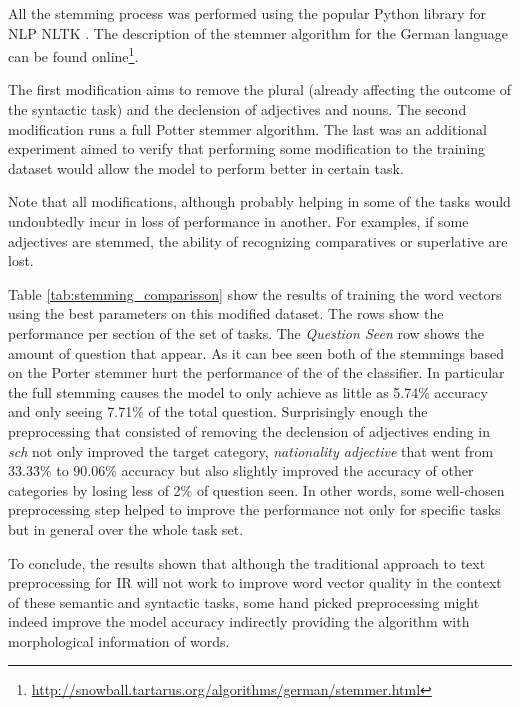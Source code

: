All the stemming process was performed using the popular Python library for
\ac{NLP}  \ac{NLTK} \cite{BirdKleinLoper09}. The
description of the stemmer algorithm for the German language can be found
online\footnote{\url{http://snowball.tartarus.org/algorithms/german/stemmer.html}}.

The first modification aims to remove the plural (already affecting the
outcome of the syntactic task) and the declension of adjectives and nouns.
The second modification runs a full Potter stemmer algorithm. The last was an
additional experiment aimed to verify that performing some modification to the
training dataset would allow the model to perform better in certain task.

Note that all modifications, although probably helping in some of the tasks
would undoubtedly incur in loss of performance in another. For examples, if
some adjectives are stemmed, the ability of recognizing comparatives or
superlative are lost.

Table \ref{tab:stemming_comparisson} show the results of training the word vectors
using the  best parameters on this modified dataset.  The rows show the
performance per section of the set of tasks. The \textit{Question Seen} row
shows the amount of question that appear.
As it can bee seen
both of the stemmings based on the Porter stemmer hurt the performance of the
of the classifier. In particular the full stemming causes the model to only
achieve as little as 5.74\% accuracy and only seeing 7.71\% of the total
question. Surprisingly enough the preprocessing that consisted of removing
the declension of adjectives  ending in \textit{sch} not only
improved the target category, \textit{nationality adjective} that went from
33.33\% to 90.06\% accuracy but also slightly improved the accuracy of other
categories by losing less of 2\% of question seen. In other words, some
well-chosen preprocessing  step helped to improve the performance not only
for specific tasks but in general over the whole task set.

To conclude, the results shown that although the traditional approach to text
preprocessing for IR will not work to improve word vector quality in the
context of these semantic and syntactic tasks,  some hand picked
preprocessing might indeed improve the  model accuracy indirectly providing
the algorithm with morphological information  of words.


